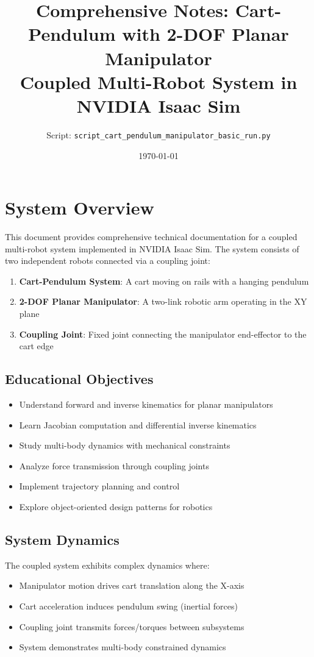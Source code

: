 \documentclass[11pt,a4paper]{article}
\title{Comprehensive Notes: Cart-Pendulum with 2-DOF Planar Manipulator\\
\large Coupled Multi-Robot System in NVIDIA Isaac Sim}
\author{Script: \texttt{script\_cart\_pendulum\_manipulator\_basic\_run.py}}
\date{\today}
\begin{document}
\maketitle

\tableofcontents
\newpage

\section{System Overview}

This document provides comprehensive technical documentation for a coupled multi-robot system implemented in NVIDIA Isaac Sim. The system consists of two independent robots connected via a coupling joint:

\begin{enumerate}
    \item \textbf{Cart-Pendulum System}: A cart moving on rails with a hanging pendulum
    \item \textbf{2-DOF Planar Manipulator}: A two-link robotic arm operating in the XY plane
    \item \textbf{Coupling Joint}: Fixed joint connecting the manipulator end-effector to the cart edge
\end{enumerate}

\subsection{Educational Objectives}

\begin{itemize}
    \item Understand forward and inverse kinematics for planar manipulators
    \item Learn Jacobian computation and differential inverse kinematics
    \item Study multi-body dynamics with mechanical constraints
    \item Analyze force transmission through coupling joints
    \item Implement trajectory planning and control
    \item Explore object-oriented design patterns for robotics
\end{itemize}

\subsection{System Dynamics}

The coupled system exhibits complex dynamics where:
\begin{itemize}
    \item Manipulator motion drives cart translation along the X-axis
    \item Cart acceleration induces pendulum swing (inertial forces)
    \item Coupling joint transmits forces/torques between subsystems
    \item System demonstrates multi-body constrained dynamics
\end{itemize}
\end{document}
